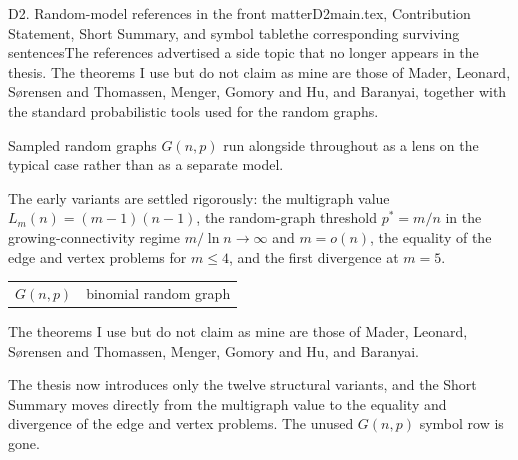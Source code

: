 \begin{offcutrewrite}{D2. Random-model references in the front matter}{D2}{main.tex, Contribution Statement, Short Summary, and symbol table}{the corresponding surviving sentences}{The references advertised a side topic that no longer appears in the thesis.}
The theorems I use but do not claim as mine are those of Mader, Leonard, S{\o}rensen and Thomassen, Menger, Gomory and Hu, and Baranyai, together with the standard probabilistic tools used for the random graphs.

Sampled random graphs $G(n,p)$ run alongside throughout as a lens on the typical case rather than as a separate model.

The early variants are settled rigorously: the multigraph value $L_m(n)=(m-1)(n-1)$, the random-graph threshold $p^*=m/n$ in the growing-connectivity regime $m/\ln n\to\infty$ and $m=o(n)$, the equality of the edge and vertex problems for $m\le4$, and the first divergence at $m=5$.

\begin{tabular}{ll}
$G(n,p)$ & binomial random graph
\end{tabular}
\nowreads
The theorems I use but do not claim as mine are those of Mader, Leonard, S{\o}rensen and Thomassen, Menger, Gomory and Hu, and Baranyai.

The thesis now introduces only the twelve structural variants, and the Short Summary moves directly from the multigraph value to the equality and divergence of the edge and vertex problems. The unused $G(n,p)$ symbol row is gone.
\end{offcutrewrite}

